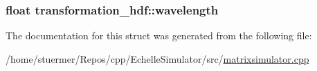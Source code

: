 \subsubsection[{\texorpdfstring{wavelength}{wavelength}}]{\setlength{\rightskip}{0pt plus 5cm}float transformation\+\_\+hdf\+::wavelength}\hypertarget{structtransformation__hdf_ad9b54c3826be9ab59e277a37e1b86168}{}\label{structtransformation__hdf_ad9b54c3826be9ab59e277a37e1b86168}


The documentation for this struct was generated from the following file\+:\begin{DoxyCompactItemize}
\item 
/home/stuermer/\+Repos/cpp/\+Echelle\+Simulator/src/\hyperlink{matrixsimulator_8cpp}{matrixsimulator.\+cpp}\end{DoxyCompactItemize}
